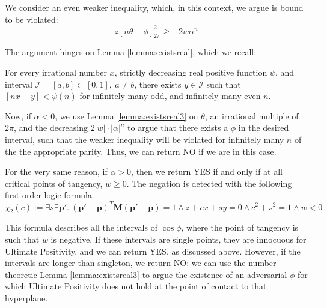 We consider an even weaker inequality, which, in this context, we argue is bound to be violated:
\begin{equation}
z[n\theta - \phi]_{2\pi}^2  \ge -2w\alpha^n
\end{equation}

The argument hinges on Lemma \ref{lemma:existsreal}, which we recall:
\begin{lemma}
\label{lemma:existsreal3}
For every irrational number $x$, strictly decreasing real positive function $\psi$, and interval $\mathcal{I} = [a, b] \subset [0, 1], ~ a \ne b$, there exists $y \in \mathcal{I}$ such that $[nx - y] < \psi(n)$ for infinitely many odd, and infinitely many even $n$.
\end{lemma}

Now, if $\alpha < 0$, we use Lemma \ref{lemma:existsreal3} on $\theta$, an irrational multiple of $2\pi$, and the decreasing $2|w|\cdot |\alpha|^n$ to argue that there exists a $\phi$ in the desired interval, such that the weaker inequality will be violated for infinitely many $n$ of the the appropriate parity. Thus, we can return NO if we are in this case.

For the very same reason, if $\alpha > 0$, then we return YES if and only if at all critical points of tangency, $w \ge 0$. The negation is detected with the following first order logic formula
\begin{equation}
\label{eq:intersectionw}
\chi_2(c):= \exists s \exists \mathbf{p'}.~ (\mathbf{p'} - \mathbf{p})^T\mathbf{M}(\mathbf{p'} - \mathbf{p}) = 1 \land z + cx + sy = 0 \land c^2 + s^2 = 1 \land w < 0
\end{equation}

This formula describes all the intervals of $\cos \phi$, where the point of tangency is such that $w$ is negative. If these intervals are single points, they are innocuous for Ultimate Positivity, and we can return YES, as discussed above. However, if the intervals are longer than singleton, we return NO: we can use the number-theoretic Lemma \ref{lemma:existsreal3} to argue the existence of an adversarial $\phi$ for which Ultimate Positivity does not hold at the point of contact to that hyperplane.

